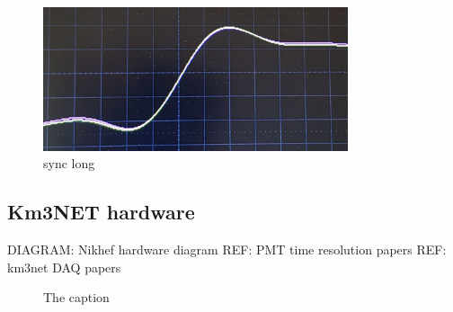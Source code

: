 \begin{figure} %
    \includegraphics[width=0.8\textwidth]{diagrams/5-daq/sync.jpg}
    \caption[sync short]
    {sync long}
    \label{fig:sync}
\end{figure}

\subsection{Km3NET hardware} %
\label{sec:daq_hard_km3net} %

DIAGRAM: Nikhef hardware diagram
REF: PMT time resolution papers
REF: km3net DAQ papers

\begin{figure} %
    \centering
    \quad
    \caption[The caption]
    {The caption}
\end{figure}

